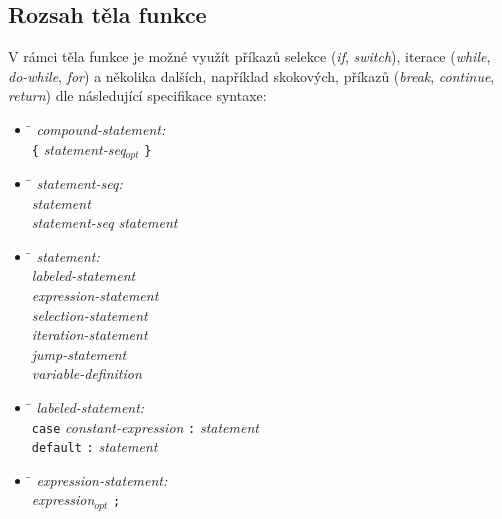 \subsection*{Rozsah těla funkce}
V rámci těla funkce je možné využít příkazů selekce (\emph{if}, \emph{switch}),
iterace (\emph{while}, \emph{do-while}, \emph{for}) a několika dalších, například skokových, příkazů (\emph{break}, \emph{continue}, \emph{return})
dle následující specifikace syntaxe:
\begin{itemize}
\item \begin{tabbing}
  \qquad \qquad \= \kill
  \emph{compound-statement:}\\
  \> \verb|{| \emph{statement-seq$_{opt}$} \verb|}|
\end{tabbing}

\item \begin{tabbing}
  \qquad \qquad \= \kill
  \emph{statement-seq:}\\
  \> \emph{statement} \\
  \> \emph{statement-seq} \emph{statement}
\end{tabbing}

\item \begin{tabbing}
  \qquad \qquad \= \kill
  \emph{statement:}\\
  \> \emph{labeled-statement} \\
  \> \emph{expression-statement} \\
  \> \emph{selection-statement} \\
  \> \emph{iteration-statement} \\
  \> \emph{jump-statement} \\
  \> \emph{variable-definition}
\end{tabbing}

\item \begin{tabbing}
  \qquad \qquad \= \kill
  \emph{labeled-statement:}\\
  \> \verb|case| \emph{constant-expression} \verb|:| \emph{statement} \\
  \> \verb|default| \verb|:| \emph{statement}
\end{tabbing}

\item \begin{tabbing}
  \qquad \qquad \= \kill
  \emph{expression-statement:}\\
  \> \emph{expression$_{opt}$} \verb|;|
\end{tabbing}


\end{itemize}
